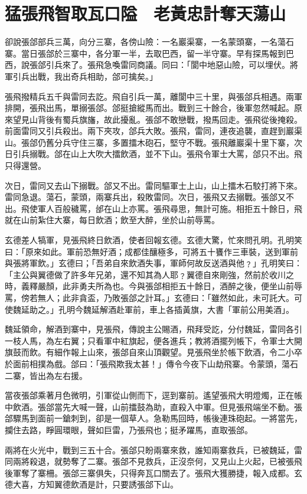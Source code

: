 
\chapter{猛張飛智取瓦口隘　老黃忠計奪天蕩山}

卻說張郃部兵三萬，向分三寨，各傍山險：一名巖渠寨，一名蒙頭寨，一名蕩石寨。當日張郃於三寨中，各分軍一半，去取巴西，留一半守寨。早有探馬報到巴西，說張郃引兵來了。張飛急喚雷同商議。同曰：「閬中地惡山險，可以埋伏。將軍引兵出戰，我出奇兵相助，郃可擒矣。」

張飛撥精兵五千與雷同去訖。飛自引兵一萬，離閬中三十里，與張郃兵相遇。兩軍排開，張飛出馬，單搦張郃。郃挺搶縱馬而出。戰到三十餘合，後軍忽然喊起。原來望見山背後有蜀兵旗旛，故此擾亂。張郃不敢戀戰，撥馬回走。張飛從後掩殺。前面雷同又引兵殺出。兩下夾攻，郃兵大敗。張飛，雷同，連夜追襲，直趕到巖渠山。張郃仍舊分兵守住三寨，多置擂木砲石，堅守不戰。張飛離巖渠十里下寨，次日引兵搦戰。郃在山上大吹大擂飲酒，並不下山。張飛令軍士大罵，郃只不出。飛只得還營。

次日，雷同又去山下搦戰。郃又不出。雷同驅軍士上山，山上擂木石駮打將下來。雷同急退。蕩石，蒙頭，兩寨兵出，殺敗雷同。次日，張飛又去搦戰。張郃又不出。飛使軍人百般穢罵，邰在山上亦罵。張飛尋思，無計可施。相拒五十餘日，飛就在山前紮住大寨，每日飲酒；飲至大醉，坐於山前辱罵。

玄德差人犒軍，見張飛終日飲酒，使者回報玄德。玄德大驚，忙來問孔明。孔明笑曰：「原來如此。軍前恐無好酒；成都佳釀極多，可將五十饔作三車裝，送到軍前與張將軍飲。」玄德曰；「吾弟自來飲酒失事，軍師何故反送酒與他﹖」孔明笑曰：「主公與翼德做了許多年兄弟，還不知其為人耶﹖翼德自來剛強，然前於收川之時，義釋嚴顏，此非勇夫所為也。今與張郃相拒五十餘日，酒醉之後，便坐山前辱罵，傍若無人；此非貪盃，乃敗張郃之計耳。」玄德曰：「雖然如此，未可託大。可使魏延助之。」孔明今魏延解酒赴軍前，車上各插黃旗，大書「軍前公用美酒」。

魏延領命，解酒到寨中，見張飛，傳說主公賜酒，飛拜受訖，分付魏延，雷同各引一枝人馬，為左右翼；只看軍中紅旗起，便各進兵；教將酒擺列帳下，令軍士大開旗鼓而飲。有細作報上山來，張郃自來山頂觀望。見張飛坐於帳下飲酒，令二小卒於面前相撲為戲。郃曰：「張飛欺我太甚！」傳令今夜下山劫飛寨。令蒙頭，蕩石二寨，皆出為左右援。

當夜張郃乘著月色微明，引軍從山側而下，逕到寨前。遙望張飛大明燈燭，正在帳中飲酒。張郃當先大喊一聲，山前擂鼓為助，直殺入中軍。但見張飛端坐不動。張郃驟馬到面前一鎗刺到，卻是一個草人。急勒馬回時，帳後連珠砲起。一將當先，攔住去路，睜圓環眼，聲如巨雷，乃張飛也；挺矛躍馬，直取張郃。

兩將在火光中，戰到三五十合。張郃只盼兩寨來救，誰知兩寨救兵，已被魏延，雷同兩將殺退，就勢奪了二寨。張郃不見救兵，正沒奈何，又見山上火起，已被張飛後軍奪了寨柵。張郃三寨俱失，只得奔瓦口關去了。張飛大獲勝捷，報入成都。玄德大喜，方知翼德飲酒是計，只要誘張郃下山。

